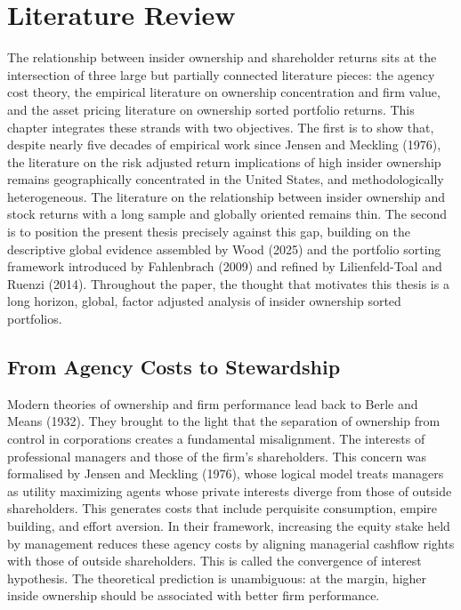 
\section{Literature Review}

The relationship between insider ownership and shareholder returns sits at the intersection of three large but partially connected literature pieces: the agency cost theory, the empirical literature on ownership concentration and firm value, and the asset pricing literature on ownership sorted portfolio returns. This chapter integrates these strands with two objectives. The first is to show that, despite nearly five decades of empirical work since Jensen and Meckling (1976), the literature on the risk adjusted return implications of high insider ownership remains geographically concentrated in the United States, and methodologically heterogeneous. The literature on the relationship between insider ownership and stock returns with a long sample and globally oriented remains thin. The second is to position the present thesis precisely against this gap, building on the descriptive global evidence assembled by Wood (2025) and the portfolio sorting framework introduced by Fahlenbrach (2009) and refined by Lilienfeld-Toal and Ruenzi (2014). Throughout the paper, the thought that motivates this thesis is a long horizon, global, factor adjusted analysis of insider ownership sorted portfolios. 


\subsection{From Agency Costs to Stewardship}

Modern theories of ownership and firm performance lead back to Berle and Means (1932). They brought to the light that the separation of ownership from control in corporations creates a fundamental misalignment. The interests of professional managers and those of the firm's shareholders. This concern was formalised by Jensen and Meckling (1976), whose logical model treats managers as utility maximizing agents whose private interests diverge from those of outside shareholders. This generates costs that include perquisite consumption, empire building, and effort aversion. In their framework, increasing the equity stake held by management reduces these agency costs by aligning managerial cashflow rights with those of outside shareholders. This is called the convergence of interest hypothesis. The theoretical prediction is unambiguous: at the margin, higher inside ownership should be associated with better firm performance.

